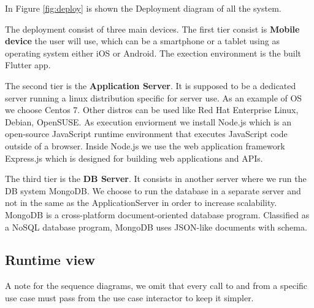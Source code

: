 In Figure \ref{fig:deploy} is shown the Deployment diagram of all the system.

The deployment consist of three main devices. The first tier consist is \textbf{Mobile device} the user will use, which can be a smartphone or a tablet using as operating system either iOS or Android.
The exection environment is the built Flutter app.


The second tier is the \textbf{Application Server}. It is supposed to be a dedicated server running a linux distribution specific for server use. As an example of OS we choose Centos 7. Other distros can be used like Red Hat Enterprise Linux, Debian, OpenSUSE.
As execution enviorment we install Node.js which is an open-source JavaScript runtime environment that executes JavaScript code outside of a browser. Inside Node.js we use the web application framework Express.js which is designed for building web applications and APIs.


The third tier is the \textbf{DB Server}. It consists in another server where we run the DB system MongoDB. We choose to run the database in a separate server and not in the same as the ApplicationServer in order to increase scalability. MongoDB is a cross-platform document-oriented database program. Classified as a NoSQL database program, MongoDB uses JSON-like documents with schema.






\subsection{Runtime view}
A note for the sequence diagrams, we omit that every call to and from a specific use case must pass from the use case interactor to keep it simpler.

